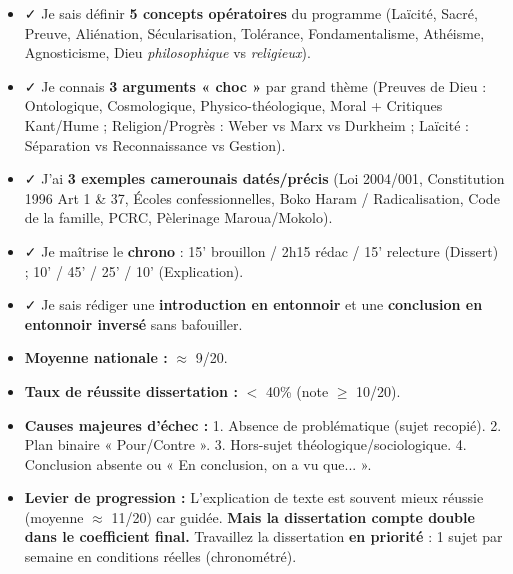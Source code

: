 \documentclass[11pt]{article}
\begin{document}
\begin{aretenir}
\begin{itemize}
    \item ✓ Je sais définir \textbf{5 concepts opératoires} du programme (Laïcité, Sacré, Preuve, Aliénation, Sécularisation, Tolérance, Fondamentalisme, Athéisme, Agnosticisme, Dieu \emph{philosophique} vs \emph{religieux}).
    \item ✓ Je connais \textbf{3 arguments « choc »} par grand thème (Preuves de Dieu : Ontologique, Cosmologique, Physico-théologique, Moral + Critiques Kant/Hume ; Religion/Progrès : Weber vs Marx vs Durkheim ; Laïcité : Séparation vs Reconnaissance vs Gestion).
    \item ✓ J'ai \textbf{3 exemples camerounais datés/précis} (Loi 2004/001, Constitution 1996 Art 1 \& 37, Écoles confessionnelles, Boko Haram / Radicalisation, Code de la famille, PCRC, Pèlerinage Maroua/Mokolo).
    \item ✓ Je maîtrise le \textbf{chrono} : 15' brouillon / 2h15 rédac / 15' relecture (Dissert) ; 10' / 45' / 25' / 10' (Explication).
    \item ✓ Je sais rédiger une \textbf{introduction en entonnoir} et une \textbf{conclusion en entonnoir inversé} sans bafouiller.
\end{itemize}
\end{aretenir}

\begin{savaistu}
\begin{itemize}
    \item \textbf{Moyenne nationale :} $\approx$ 9/20.
    \item \textbf{Taux de réussite dissertation :} $<$ 40\% (note $\ge$ 10/20).
    \item \textbf{Causes majeures d'échec :} 1. Absence de problématique (sujet recopié). 2. Plan binaire « Pour/Contre ». 3. Hors-sujet théologique/sociologique. 4. Conclusion absente ou « En conclusion, on a vu que... ».
    \item \textbf{Levier de progression :} L'explication de texte est souvent mieux réussie (moyenne $\approx$ 11/20) car guidée. \textbf{Mais la dissertation compte double dans le coefficient final.} Travaillez la dissertation \textbf{en priorité} : 1 sujet par semaine en conditions réelles (chronométré).
\end{itemize}
\end{savaistu}
\end{document}
